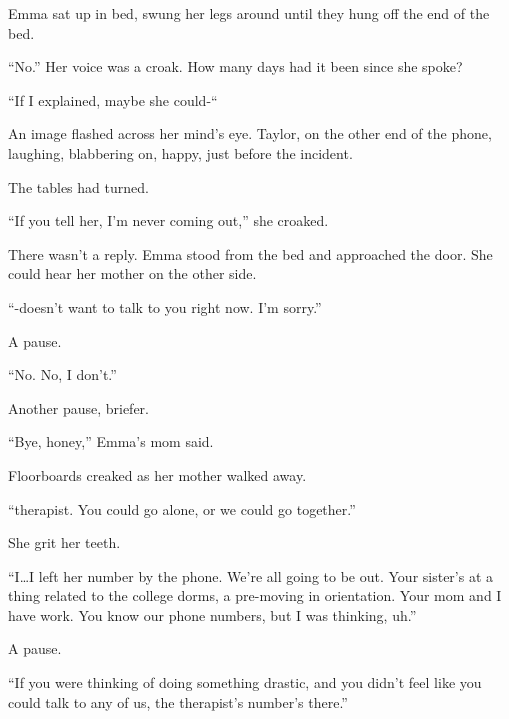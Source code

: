 Emma sat up in bed, swung her legs around until they hung off the end of the bed.



``No.''  Her voice was a croak.  How many days had it been since she spoke?



``If I explained, maybe she could-``



An image flashed across her mind's eye.  Taylor, on the other end of the phone, laughing, blabbering on, happy, just before the incident.



The tables had turned.



``If you tell her, I'm never coming out,'' she croaked.



There wasn't a reply.  Emma stood from the bed and approached the door.  She could hear her mother on the other side.



``-doesn't want to talk to you right now.  I'm sorry.''



A pause.



``No.  No, I don't.''



Another pause, briefer.



``Bye, honey,'' Emma's mom said.



Floorboards creaked as her mother walked away.



\blacksquare



``\ldotsa therapist.  You could go alone, or we could go together.''



She grit her teeth.



``I\ldots I left her number by the phone.  We're all going to be out.  Your sister's at a thing related to the college dorms, a pre-moving in orientation.  Your mom and I have work.  You know our phone numbers, but I was thinking, uh.''



A pause.



``If you were thinking of doing something drastic, and you didn't feel like you could talk to any of us, the therapist's number's there.''



